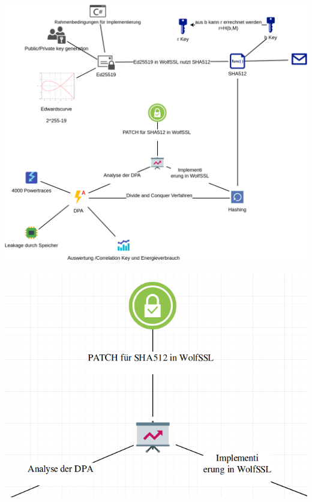 \documentclass[
  10pt,
  ignorenonframetext,
  aspectratio=43,
]{beamer}
\begin{document}
\begin{frame}{}
\protect\hypertarget{section-23}{}
\includegraphics{Abbildungen/ITSEC(1)_res.png}
\end{frame}

\begin{frame}{}
\protect\hypertarget{section-24}{}
\includegraphics{Abbildungen/Punkt5.png}
\end{frame}
\end{document}
